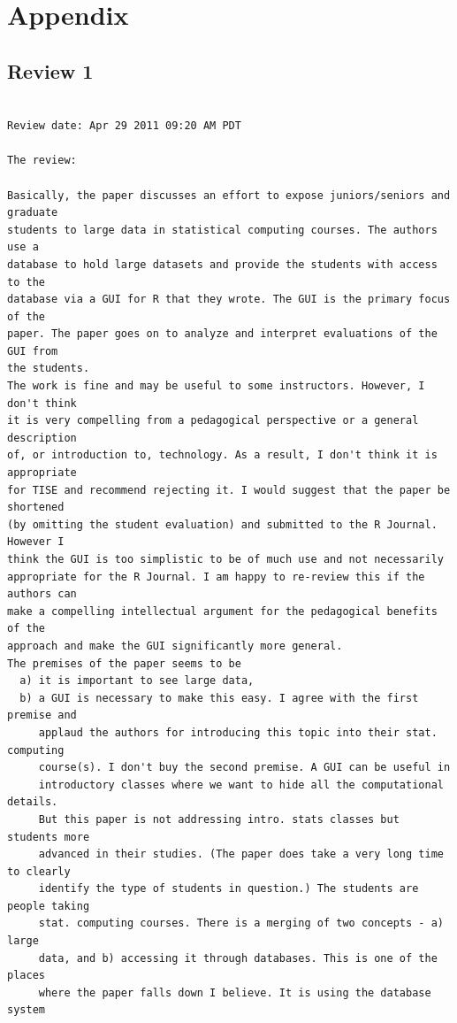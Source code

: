 \documentclass[11pt]{tise_style}
\begin{document}
\newpage

\section{Appendix}

\subsection{Review 1}

\begin{verbatim}

Review date: Apr 29 2011 09:20 AM PDT

The review:

Basically, the paper discusses an effort to expose juniors/seniors and graduate
students to large data in statistical computing courses. The authors use a
database to hold large datasets and provide the students with access to the
database via a GUI for R that they wrote. The GUI is the primary focus of the
paper. The paper goes on to analyze and interpret evaluations of the GUI from
the students.
The work is fine and may be useful to some instructors. However, I don't think
it is very compelling from a pedagogical perspective or a general description
of, or introduction to, technology. As a result, I don't think it is appropriate
for TISE and recommend rejecting it. I would suggest that the paper be shortened
(by omitting the student evaluation) and submitted to the R Journal. However I
think the GUI is too simplistic to be of much use and not necessarily
appropriate for the R Journal. I am happy to re-review this if the authors can
make a compelling intellectual argument for the pedagogical benefits of the
approach and make the GUI significantly more general.
The premises of the paper seems to be
  a) it is important to see large data,
  b) a GUI is necessary to make this easy. I agree with the first premise and
     applaud the authors for introducing this topic into their stat. computing
     course(s). I don't buy the second premise. A GUI can be useful in
     introductory classes where we want to hide all the computational details.
     But this paper is not addressing intro. stats classes but students more
     advanced in their studies. (The paper does take a very long time to clearly
     identify the type of students in question.) The students are people taking
     stat. computing courses. There is a merging of two concepts - a) large
     data, and b) accessing it through databases. This is one of the places
     where the paper falls down I believe. It is using the database system

\end{verbatim}
\end{document}
